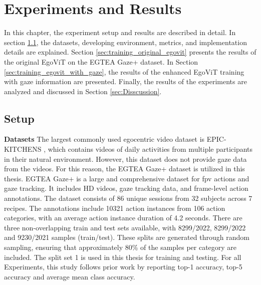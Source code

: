 \chapter{Experiments and Results}
\label{chap:experiments}
In this chapter, the experiment setup and results are described in detail. In section \ref{sec:setup}, the datasets, developing environment, metrics, and implementation details are explained. Section \ref{sec:training_original_egovit} presents the results of the original EgoViT on the EGTEA Gaze+ dataset. In Section \ref{sec:training_egovit_with_gaze}, the results of the enhanced EgoViT training with gaze information are presented. Finally, the results of the experiments are analyzed and discussed in Section \ref{sec:Disscussion}.


\section{Setup}
\label{sec:setup}
\textbf{Datasets} The largest commonly used egocentric video dataset is EPIC-KITCHENS \cite{Damen2018EPICKITCHENS}, which contains videos of daily activities from multiple participants in their natural environment. However, this dataset does not provide gaze data from the videos. For this reason, the EGTEA Gaze+ \cite{li_eye_2020} dataset is utilized in this thesis. EGTEA Gaze+ is a large and comprehensive dataset for \gls{fpv} actions and gaze tracking. It includes HD videos, gaze tracking data, and frame-level action annotations. The dataset consists of 86 unique sessions from 32 subjects across 7 recipes. The annotations include 10321 action instances from 106 action categories, with an average action instance duration of 4.2 seconds. There are three non-overlapping train and test sets available, with 8299/2022, 8299/2022 and 9230/2021 samples (train/test). These splits are generated through random sampling, ensuring that approximately  80\% of the samples per category are included. The split set 1 is used in this thesis for training and testing. For all Experiments, this study follows prior work by reporting top-1 accuracy, top-5 accuracy and average mean class accuracy.

